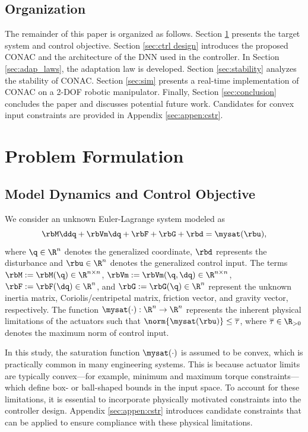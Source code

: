 \documentclass[letterpaper, journal]{IEEEtran}
\begin{document}
\subsection{Organization}

The remainder of this paper is organized as follows. 
Section \ref{sec:Problem Formulation} presents the target system and control objective.
Section \ref{sec:ctrl design} introduces the proposed CONAC and the architecture of the DNN used in the controller. 
In Section \ref{sec:adap_laws}, the adaptation law is developed.
Section \ref{sec:stability} analyzes the stability of CONAC.
Section \ref{sec:sim} presents a real-time implementation of CONAC on a 2-DOF robotic manipulator.
Finally, Section \ref{sec:conclusion} concludes the paper and discusses potential future work.
Candidates for convex input constraints are provided in Appendix \ref{sec:appen:cstr}. 

\section{Problem Formulation}\label{sec:Problem Formulation}

\subsection{Model Dynamics and Control Objective}

We consider an unknown Euler-Lagrange system modeled as
\begin{equation}
    \rbM\ddq +\rbVm \dq+ \rbF + \rbG + \rbd
    =
    \mysat(\rbu)
    ,
    \label{eq:sys1}
\end{equation}
where $\q\in \R^n$ denotes the generalized coordinate, $\rbd$ represents the disturbance and $\rbu\in\R^n$ denotes the generalized control input. 
The terms $\rbM:=\rbM(\q)\in\R^{n\times n}$, $\rbVm:=\rbVm(\q,\dq)\in\R^{n\times n}$, $\rbF:=\rbF(\dq)\in\R^{n}$, and $\rbG:=\rbG(\q)\in\R^{n}$ represent the unknown inertia matrix, Coriolis/centripetal matrix, friction vector, and gravity vector, respectively.
The function $\mysat(\cdot):\R^n\to\R^n$ represents the inherent physical limitations of the actuators such that $\norm{\mysat(\rbu)}\le \overline\tau$, where $\overline\tau\in\R_{>0}$ denotes the maximum norm of control input.

In this study, the saturation function $\mysat(\cdot)$ is assumed to be convex, which is practically common in many engineering systems.
This is because actuator limits are typically convex—for example, minimum and maximum torque constraints—which define box- or ball-shaped bounds in the input space.
To account for these limitations, it is essential to incorporate physically motivated constraints into the controller design.
Appendix \ref{sec:appen:cstr} introduces candidate constraints that can be applied to ensure compliance with these physical limitations.
\end{document}
